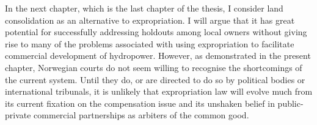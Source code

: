 
In the next chapter, which is the last chapter of the thesis, I consider land consolidation as an alternative to expropriation. I will argue that it has great potential for successfully addressing holdouts among local owners without giving rise to many of the problems associated with using expropriation to facilitate commercial development of hydropower. However, as demonstrated in the present chapter, Norwegian courts do not seem willing to recognise the shortcomings of the current system. Until they do, or are directed to do so by political bodies or international tribunals, it is unlikely that expropriation law will evolve much from its current fixation on the compensation issue and its unshaken belief in public-private commercial partnerships as arbiters of the common good.
